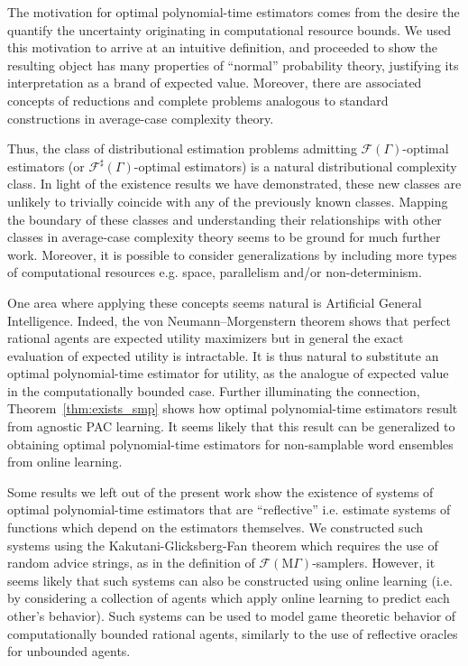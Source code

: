 \documentclass{article}
\numberwithin{equation}{section}
\theoremstyle{definition}
\theoremstyle{plain}
\newcommand{\MGrow}{\mathrm{M}\Gamma}
\newcommand{\Fall}{\mathcal{F}}
\newcommand{\EG}{\Fall(\Gamma)}
\newcommand{\ESG}{\Fall^\sharp(\Gamma)}
\newcommand{\EMG}{\Fall(\MGrow)}
\begin{document}
The motivation for optimal polynomial-time estimators comes from the desire the quantify the uncertainty originating in computational resource bounds. We used this motivation to arrive at an intuitive definition, and proceeded to show the resulting object has many properties of \enquote{normal} probability theory, justifying its interpretation as a brand of expected value. Moreover, there are associated concepts of reductions and complete problems analogous to standard constructions in average-case complexity theory. 

Thus, the class of distributional estimation problems admitting ${\EG}$-optimal estimators (or ${\ESG}$-optimal estimators) is a natural distributional complexity class. In light of the existence results we have demonstrated, these new classes are unlikely to trivially coincide with any of the previously known classes. Mapping the boundary of these classes and understanding their relationships with other classes in average-case complexity theory seems to be ground for much further work. Moreover, it is possible to consider generalizations by including more types of computational resources e.g. space, parallelism and/or non-determinism.

One area where applying these concepts seems natural is Artificial General Intelligence. Indeed, the von Neumann–Morgenstern theorem shows that perfect rational agents are expected utility maximizers but in general the exact evaluation of expected utility is intractable. It is thus natural to substitute an optimal polynomial-time estimator for utility, as the analogue of expected value in the computationally bounded case. Further illuminating the connection, Theorem~\ref{thm:exists_smp} shows how optimal polynomial-time estimators result from agnostic PAC learning. It seems likely that this result can be generalized to obtaining optimal polynomial-time estimators for non-samplable word ensembles from online learning.

Some results we left out of the present work show the existence of systems of optimal polynomial-time estimators that are \enquote{reflective} i.e. estimate systems of functions which depend on the estimators themselves. We constructed such systems using the Kakutani-Glicksberg-Fan theorem which requires the use of random advice strings, as in the definition of ${\EMG}$-samplers. However, it seems likely that such systems can also be constructed using online learning (i.e. by considering a collection of agents which apply online learning to predict each other's behavior). Such systems can be used to model game theoretic behavior of computationally bounded rational agents, similarly to the use of reflective oracles\cite{Fallenstein_2015} for unbounded agents. 
\end{document}
